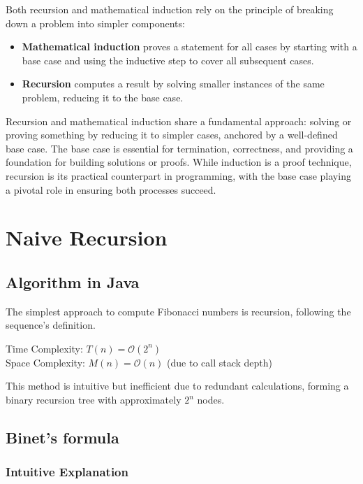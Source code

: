 \documentclass{article}
\begin{document}
Both recursion and mathematical induction rely on the principle of breaking down a problem into simpler components:
\begin{itemize}
	\item \textbf{Mathematical induction} proves a statement for all cases by starting with a base case and using the inductive step to cover all subsequent cases.
	\item \textbf{Recursion} computes a result by solving smaller instances of the same problem, reducing it to the base case.
\end{itemize}

Recursion and mathematical induction share a fundamental approach: solving or proving something by reducing it to simpler cases, anchored by a well-defined base case. The base case is essential for termination, correctness, and providing a foundation for building solutions or proofs. While induction is a proof technique, recursion is its practical counterpart in programming, with the base case playing a pivotal role in ensuring both processes succeed.

\section{Naive Recursion}
\subsection{Algorithm in Java}
The simplest approach to compute Fibonacci numbers is recursion, following the sequence's definition.

Time Complexity: $T(n) = \mathcal{O}(2^n)$ \\
Space Complexity: $M(n) = \mathcal{O}(n)$ (due to call stack depth)



This method is intuitive but inefficient due to redundant calculations, forming a binary recursion tree with approximately $2^n$ nodes.

\subsection{Binet's formula}
\subsubsection{Intuitive Explanation}
\end{document}
